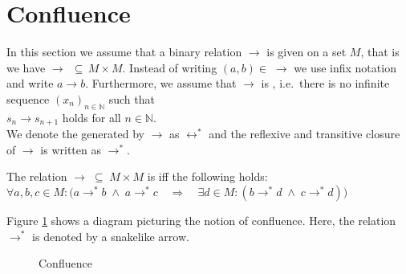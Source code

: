 \section{Confluence}
In this section we assume that a binary relation $\rightarrow$ is given on a set $M$, that is we have
$\rightarrow \,\;\subseteq\, M \!\times\! M$.  Instead of writing $(a, b) \in\; \rightarrow$ we use infix notation and write
$a \rightarrow b$.  Furthermore, we assume that $\rightarrow$ is ,
i.e.~there is no infinite sequence $(x_n)_{n\in\mathbb{N}}$ such that
\\[0.2cm]
\hspace*{1.3cm}
$s_n \rightarrow s_{n+1}$ \quad holds for all $n\in\mathbb{N}$.
\\[0.2cm]
We denote the  generated by $\rightarrow$ as $\leftrightarrow^*$ and the reflexive and
transitive closure of $\rightarrow$ is written as $\rightarrow^*$.

\begin{Definition}[Confluence] 
  The relation $\rightarrow \;\subseteq\; M \times M$ is  iff the following holds:
  \\[0.2cm]
  \hspace*{1.3cm}
  $\forall a, b, c \in M: \bigl(a \rightarrow^* b \;\wedge\; a \rightarrow^*c \quad\Rightarrow\quad
   \exists d \in M: (b \rightarrow^* d \;\wedge\; c \rightarrow^* d)\bigr)
  $ \eox
\end{Definition}

\noindent
Figure \ref{fig:confluence.tikz} shows a diagram picturing the notion of confluence.
Here, the relation $\rightarrow^*$ is denoted by a snakelike arrow.
\begin{figure}[!ht]
    \centering
    \caption{Confluence}
    \label{fig:confluence.tikz}
\end{figure}

